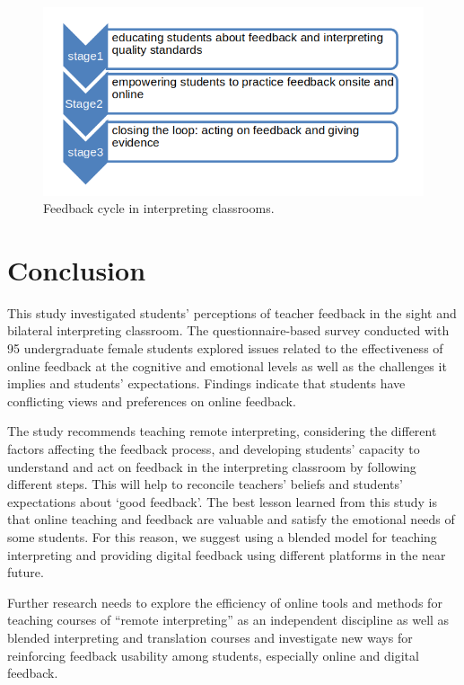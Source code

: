 \documentclass[english]{textolivre}
\begin{document}
\begin{figure}[h!]
 \centering
 \begin{minipage}{.85\textwidth}
 \includegraphics[width=\textwidth]{18.png}
 \caption{Feedback cycle in interpreting classrooms.}
 \label{fig18}
 \end{minipage}
\end{figure}


\section{Conclusion}\label{sec-formato}
This study investigated students’ perceptions of teacher feedback in the sight and bilateral interpreting classroom. The questionnaire-based survey conducted with 95 undergraduate female students explored issues related to the effectiveness of online feedback at the cognitive and emotional levels as well as the challenges it implies and students’ expectations. Findings indicate that students have conflicting views and preferences on online feedback.

The study recommends teaching remote interpreting, considering the different factors affecting the feedback process, and developing students’ capacity to understand and act on feedback in the interpreting classroom by following different steps. This will help to reconcile teachers’ beliefs and students’ expectations about ‘good feedback’. The best lesson learned from this study is that online teaching and feedback are valuable and satisfy the emotional needs of some students. For this reason, we suggest using a blended model for teaching interpreting and providing digital feedback using different platforms in the near future.

Further research needs to explore the efficiency of online tools and methods for teaching courses of “remote interpreting” as an independent discipline as well as blended interpreting and translation courses and investigate new ways for reinforcing feedback usability among students, especially online and digital feedback.

\printbibliography\label{sec-bib}
\end{document}
